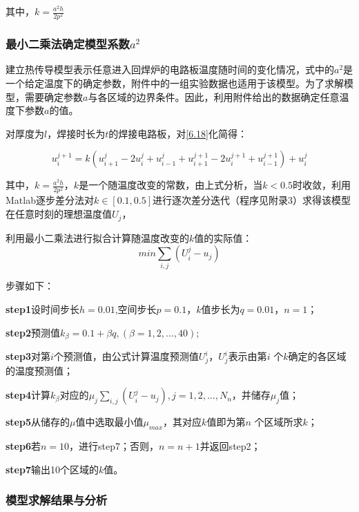 \documentclass[withoutpreface,bwprint]{cumcmthesis} %
\numberwithin{equation}{subsection}
\begin{document}
\begin{enumerate}
	其中，$k=\frac{a^2h}{2p^2}$

\end{enumerate}

\subsubsection{最小二乘法确定模型系数$a^2$}

建立热传导模型表示任意进入回焊炉的电路板温度随时间的变化情况，式中的$a^2$是一个给定温度下的确定参数，附件中的一组实验数据也适用于该模型。为了求解模型，需要确定参数$a$与各区域的边界条件。因此，利用附件给出的数据确定任意温度下参数$a$的值。

对厚度为$l$，焊接时长为$t$的焊接电路板，对\eqref{6.18}化简得：

\begin{equation}
	u_{i}^{j+1}=k\left(u_{i+1}^{j}-2 u_{i}^{j}+u_{i-1}^{j}+u_{i+1}^{j+1}-2 u_{i}^{j+1}+u_{i-1}^{j+1}\right)+u_{i}^{j}
	\label{6.20}
\end{equation}

其中，$k=\frac{a^2h}{2p^2}$，$k$是一个随温度改变的常数，由上式分析，当$k<0.5$时收敛，利用Matlab逐步差分法对$k\in[0.1,0.5]$进行逐次差分迭代（程序见附录3）求得该模型在任意时刻的理想温度值$U_{j}$，

利用最小二乘法进行拟合计算随温度改变的$k$值的实际值：
\begin{equation}
	min\sum_{i,j}(U_{i}^j-u_{j})
\end{equation}

步骤如下：

\textbf{step1}\quad 设时间步长$h=0.01$,空间步长$p=0.1$，$k$值步长为$q=0.01$，$n =1$；

\textbf{step2}\quad 预测值$k_{\beta}=0.1+\beta q,(\beta=1,2,...,40)$;

\textbf{step3}\quad 对第$i$个预测值，由公式计算温度预测值$U_{j}^i$，$U_{j}^i$表示由第$i$ 个$k$确定的各区域的温度预测值；

\textbf{step4}\quad 计算$k_{\beta}$对应的$\mu _{j}\sum_{i,j}(U_{i}^j-u_{j}),j=1,2,...,N_{n}$，并储存$\mu _{j}$值；

\textbf{step5}\quad 从储存的$\mu$值中选取最小值$\mu_{max}$，其对应$k$值即为第$n$ 个区域所求$k$；

\textbf{step6}\quad 若$n =10$，进行step7；否则，$n =n +1$并返回step2；

\textbf{step7}\quad 输出10个区域的$k$值。

\subsubsection{模型求解结果与分析}
\end{document}
